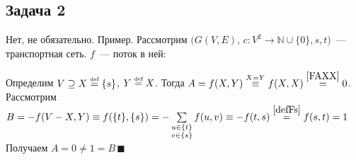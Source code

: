 \documentclass[a4paper]{article}
\def\eqdef{\overset{\mbox{\tiny def}}{=}}
\newcommand{\Nz}{\mathbb{N}\cup\{0\}}
\begin{document}
\subsection*{Задача 2}
Нет, не обязательно. Пример. Рассмотрим $(G(V,E)$, $c\colon V^2\to\Nz, s, t)$~--- транспортная сеть. $f$~--- поток в ней:\newline
{}\newline
Определим $V\supseteq X\eqdef\{s\}$, $Y\eqdef X$. Тогда $A=f(X,Y)\overset{X=Y}{\equiv} f(X,X)\overset{\ref{FAXX}}{=}0$.\newline
Рассмотрим $B=-f(V-X,Y)\equiv f(\{t\},\{s\})=-\sum\limits_{\substack{u\in\{t\}\\v\in\{s\}}}f(u,v)\equiv -f(t,s)\overset{\ref{defFs}}{=}f(s,t)=1$\newline
Получаем $A=0\neq 1=B\,\blacksquare$
\end{document}
